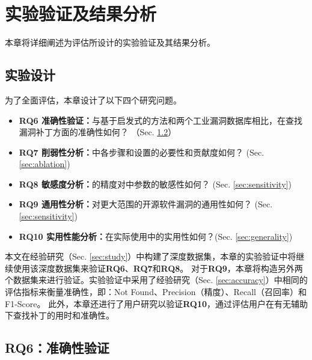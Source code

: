 \chapter{实验验证及结果分析}

本章将详细阐述为评估\tool 所设计的实验验证及其结果分析。


\section{实验设计}
为了全面评估\tool ，本章设计了以下四个研究问题。

\begin{itemize}[leftmargin=*]
\item \textbf{RQ6 准确性验证：}与基于启发式的方法和两个工业漏洞数据库相比，\tool 在查找漏洞补丁方面的准确性如何？ （Sec. \ref{sec:accuracy-evaluation}）
\item \textbf{RQ7 削弱性分析：}\tool 中各步骤和设置的必要性和贡献度如何？ (Sec.\ref{sec:ablation})%
\item \textbf{RQ8 敏感度分析：}\tool 的精度对\tool 中参数的敏感性如何？ (Sec. \ref{sec:sensitivity})
\item \textbf{RQ9 通用性分析：}\tool 对更大范围的开源软件漏洞的通用性如何？ (Sec. \ref{sec:sensitivity})
\item \textbf{RQ10 实用性能分析：}\tool 在实际使用中的实用性如何？(Sec. \ref{sec:generality})
\end{itemize}


本文在经验研究（Sec. \ref{sec:study}）中构建了深度数据集，本章的实验验证中将继续使用该深度数据集来验证\textbf{RQ6}、\textbf{RQ7}和\textbf{RQ8}。 对于\textbf{RQ9}，本章将构造另外两个数据集来进行验证。实验验证中采用了经验研究（Sec. \ref{sec:accuracy}）中相同的评估指标来衡量准确性，即：Not Found、Precision（精度）、Recall（召回率）和 F1-Score。
此外，本章还进行了用户研究以验证\textbf{RQ10}，通过评估用户在有无\tool 辅助下查找补丁的用时和准确性。


\section{RQ6：准确性验证}\label{sec:accuracy-evaluation}

